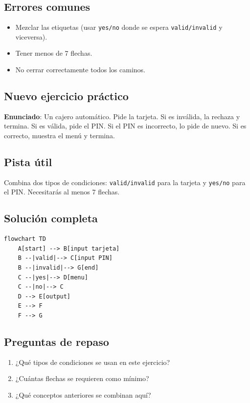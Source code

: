 \documentclass[12pt]{article}
\begin{document}
\subsection{Errores comunes}

\begin{itemize}
    \item Mezclar las etiquetas (usar \texttt{yes/no} donde se espera \texttt{valid/invalid} y viceversa).
    \item Tener menos de 7 flechas.
    \item No cerrar correctamente todos los caminos.
\end{itemize}

\subsection{Nuevo ejercicio práctico}

\textbf{Enunciado}: Un cajero automático. Pide la tarjeta. Si es inválida, la rechaza y termina. Si es válida, pide el PIN. Si el PIN es incorrecto, lo pide de nuevo. Si es correcto, muestra el menú y termina.

\subsection{Pista útil}

Combina dos tipos de condiciones: \texttt{valid/invalid} para la tarjeta y \texttt{yes/no} para el PIN. Necesitarás al menos 7 flechas.

\subsection{Solución completa}

\begin{lstlisting}[style=mermaidstyle]
flowchart TD
    A[start] --> B[input tarjeta]
    B --|valid|--> C[input PIN]
    B --|invalid|--> G[end]
    C --|yes|--> D[menu]
    C --|no|--> C
    D --> E[output]
    E --> F
    F --> G
\end{lstlisting}

\subsection{Preguntas de repaso}

\begin{enumerate}
    \item ¿Qué tipos de condiciones se usan en este ejercicio?
    \item ¿Cuántas flechas se requieren como mínimo?
    \item ¿Qué conceptos anteriores se combinan aquí?
\end{enumerate}
\end{document}

